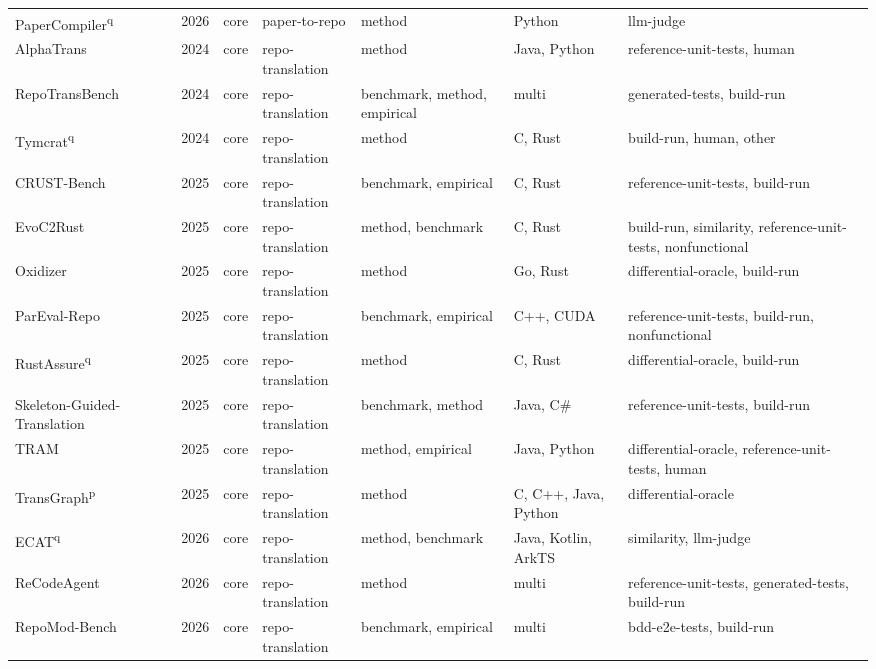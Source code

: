 {\begin{longtable}{@{}p{2.8cm}lllp{1.9cm}p{1.5cm}p{2.9cm}@{}}
PaperCompiler\textsuperscript{q}~\cite{PaperCompiler2026} & 2026 & core & paper-to-repo & method & Python & llm-judge \\
AlphaTrans~\cite{AlphaTrans2024} & 2024 & core & repo-translation & method & Java, Python & reference-unit-tests, human \\
RepoTransBench~\cite{RepoTransBench2024} & 2024 & core & repo-translation & benchmark, method, empirical & multi & generated-tests, build-run \\
Tymcrat\textsuperscript{q}~\cite{Tymcrat2024} & 2024 & core & repo-translation & method & C, Rust & build-run, human, other \\
CRUST-Bench~\cite{CRUSTBench2025} & 2025 & core & repo-translation & benchmark, empirical & C, Rust & reference-unit-tests, build-run \\
EvoC2Rust~\cite{EvoC2Rust2025} & 2025 & core & repo-translation & method, benchmark & C, Rust & build-run, similarity, reference-unit-tests, nonfunctional \\
Oxidizer~\cite{Oxidizer2025} & 2025 & core & repo-translation & method & Go, Rust & differential-oracle, build-run \\
ParEval-Repo~\cite{ParEvalRepo2025} & 2025 & core & repo-translation & benchmark, empirical & C++, CUDA & reference-unit-tests, build-run, nonfunctional \\
RustAssure\textsuperscript{q}~\cite{RustAssure2025} & 2025 & core & repo-translation & method & C, Rust & differential-oracle, build-run \\
Skeleton-Guided-Translation~\cite{SkeletonGuidedTranslatio2025} & 2025 & core & repo-translation & benchmark, method & Java, C\# & reference-unit-tests, build-run \\
TRAM~\cite{TRAM2025} & 2025 & core & repo-translation & method, empirical & Java, Python & differential-oracle, reference-unit-tests, human \\
TransGraph\textsuperscript{p}~\cite{TransGraph2025} & 2025 & core & repo-translation & method & C, C++, Java, Python & differential-oracle \\
ECAT\textsuperscript{q}~\cite{ECAT2026} & 2026 & core & repo-translation & method, benchmark & Java, Kotlin, ArkTS & similarity, llm-judge \\
ReCodeAgent~\cite{ReCodeAgent2026} & 2026 & core & repo-translation & method & multi & reference-unit-tests, generated-tests, build-run \\
RepoMod-Bench~\cite{RepoModBench2026} & 2026 & core & repo-translation & benchmark, empirical & multi & bdd-e2e-tests, build-run \\

\end{longtable}}
